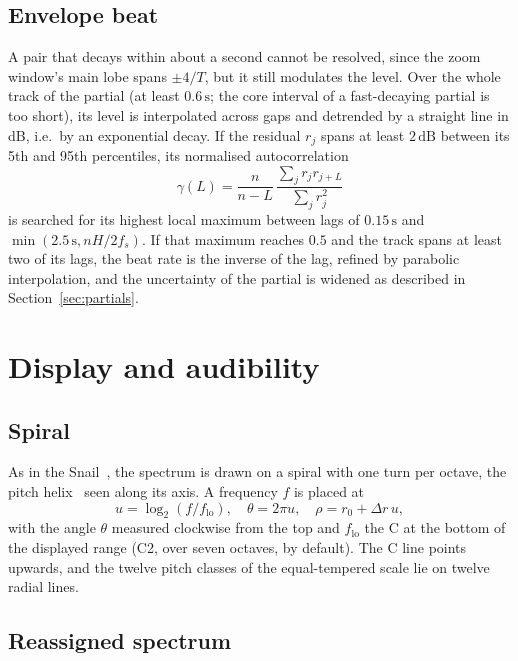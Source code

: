 \documentclass[10pt,a4paper,twocolumn]{article}
\newcommand{\dB}{\,\mathrm{dB}}
\newcommand{\s}{\,\mathrm{s}}
\begin{document}
\subsection{Envelope beat}

A pair that decays within about a second cannot be resolved, since the zoom window's main lobe spans $\pm 4/T$, but it still modulates the level. Over the whole track of the partial (at least $0.6\s$; the core interval of a fast-decaying partial is too short), its level is interpolated across gaps and detrended by a straight line in dB, i.e.\ by an exponential decay. If the residual $r_j$ spans at least $2\dB$ between its 5th and 95th percentiles, its normalised autocorrelation
\begin{equation}
\gamma(L) = \frac{n}{n-L}\, \frac{\sum_{j} r_j r_{j+L}}{\sum_j r_j^2}
\end{equation}
is searched for its highest local maximum between lags of $0.15\s$ and $\min(2.5\s, nH/2f_s)$. If that maximum reaches $0.5$ and the track spans at least two of its lags, the beat rate is the inverse of the lag, refined by parabolic interpolation, and the uncertainty of the partial is widened as described in Section~\ref{sec:partials}.


\section{Display and audibility}
\label{sec:display}

\subsection{Spiral}

As in the Snail~\cite{HelieSnail}, the spectrum is drawn on a spiral with one turn per octave, the pitch helix~\cite{Drobisch,Shepard82} seen along its axis. A frequency $f$ is placed at
\begin{equation}
u = \log_2(f/f_{\mathrm{lo}}),\quad \theta = 2\pi u,\quad \rho = r_0 + \Delta r\, u,
\end{equation}
with the angle $\theta$ measured clockwise from the top and $f_{\mathrm{lo}}$ the C at the bottom of the displayed range (C2, over seven octaves, by default). The C line points upwards, and the twelve pitch classes of the equal-tempered scale lie on twelve radial lines.

\subsection{Reassigned spectrum}
\end{document}
